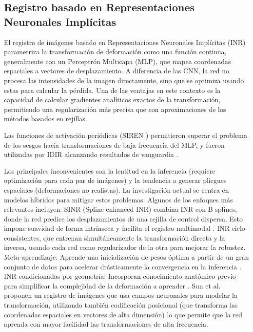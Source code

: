 \subsection{Registro basado en Representaciones Neuronales Implícitas}\label{subsec:Rexistro_baseado_en_INRs}

El registro de imágenes basado en Representaciones Neuronales Implícitas (INR) parametriza la transformación de deformación como una función continua, generalmente con un Perceptrón Multicapa (MLP), que mapea coordenadas espaciales a vectores de desplazamiento. A diferencia de las CNN, la red no procesa las intensidades de la imagen directamente, sino que se optimiza usando estas para calcular la pérdida. Una de las ventajas en este contexto es la capacidad de calcular gradientes analíticos exactos de la transformación, permitiendo una regularización más precisa que con aproximaciones de los métodos basados en rejillas.

Las funciones de activación periódicas (SIREN \cite{sitzmann2020implicitneuralrepresentationsperiodic}) permitieron superar el problema de los sesgos hacia transformaciones de baja frecuencia del MLP, y fueron utilizadas por IDIR alcanzando resultados de vanguardia \cite{wolterink2021implicit}.

Los principales inconvenientes son la lentitud en la inferencia (requiere optimización para cada par de imágenes) y la tendencia a generar pliegues espaciales (deformaciones no realistas). La investigación actual se centra en modelos híbridos para mitigar estos problemas.
Algunos de los enfoques más relevantes incluyen:
SINR (Spline-enhanced INR) combina INR con B-splines, donde la red predice los desplazamientos de una rejilla de control dispersa. Esto impone suavidad de forma intrínseca y facilita el registro multimodal \cite{SINR}.
INR ciclo-consistentes, que entrenan simultáneamente la transformación directa y la inversa, usando cada red como regularizador de la otra para mejorar la robustez.
Meta-aprendizaje: Aprende una inicialización de pesos óptima a partir de un gran conjunto de datos para acelerar drásticamente la convergencia en la inferencia \cite{learnedinit}.
INR condicionadas por geometría: Incorporan conocimiento anatómico previo para simplificar la complejidad de la deformación a aprender \cite{harten2023deformable}.
Sun et al. \cite{sun2024medicalimageregistrationneural} proponen un registro de imágenes que usa campos neuronales para modelar la transformación, utilizando también codificación posicional (que transforma las coordenadas espaciales en vectores de alta dimensión) lo que permite que la red aprenda con mayor facilidad las transformaciones de alta frecuencia.

